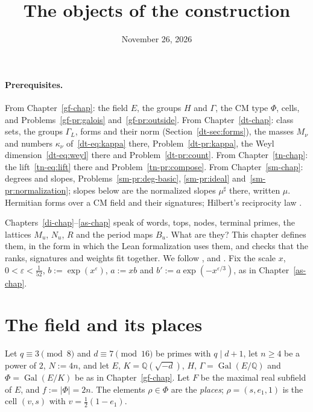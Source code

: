\documentclass[reqno]{amsart}
\title{The objects of the construction}
\author{}
\date{November 26, 2026}
\newcounter{chap}
\theoremstyle{definition}
\theoremstyle{plain}
\theoremstyle{remark}
\newcommand{\Q}{\mathbb Q}
\newcommand{\Gal}{\operatorname{Gal}}
\begin{document}
\maketitle
{}\label{chap}

\paragraph{Prerequisites.}
From Chapter~\ref{gf-chap}: the field \(E\), the groups \(H\) and \(\Gamma\), the CM type \(\Phi\), cells, and Problems~\ref{gf-pr:galois} and~\ref{gf-pr:outside}.  From Chapter~\ref{dt-chap}: class sets, the groups \(\Gamma_L\), forms and their norm (Section~\ref{dt-sec:forms}), the masses \(M_\nu\) and numbers \(\kappa_\nu\) of~\eqref{dt-eq:kappa} there, Problem~\ref{dt-pr:kappa}, the Weyl dimension~\eqref{dt-eq:weyl} there and Problem~\ref{dt-pr:count}.  From Chapter~\ref{tn-chap}: the lift~\eqref{tn-eq:lift} there and Problem~\ref{tn-pr:compose}.  From Chapter~\ref{sm-chap}: degrees and slopes, Problems~\ref{sm-pr:deg-basic}, \ref{sm-pr:ideal} and~\ref{sm-pr:normalization}; slopes below are the normalized slopes \(\mu^\sharp\) there, written \(\mu\).  Hermitian forms over a CM field and their signatures; Hilbert's reciprocity law \cite[Ch.~VI, \S8]{Ne}.

\medskip
Chapters~\ref{di-chap}--\ref{as-chap} speak of words, tops, nodes, terminal primes, the lattices \(M_u\), \(N_u\), \(R\) and the period maps \(B_u\).  What are they?  This chapter defines them, in the form in which the Lean formalization \cite{Lean} uses them, and checks that the ranks, signatures and weights fit together.  We follow \cite[\S III.10]{Rub}, \cite[\S4.1]{Zh} and \cite[\S7, Defs.~6.1, 11.5--11.10, 18.5, 18.9]{Adr}.  Fix the scale \(x\), \(0<\varepsilon<\frac1{52}\), \(b:=\exp(x^\varepsilon)\), \(a:=xb\) and \(b':=a\exp(-x^{\varepsilon/3})\), as in Chapter~\ref{as-chap}.

\section{The field and its places}\label{sec:field}

Let \(q\equiv3\pmod 8\) and \(d\equiv7\pmod{16}\) be primes with \(q\mid d+1\), let \(n\ge4\) be a power of \(2\), \(N:=4n\), and let \(E\), \(K=\Q(\sqrt{-d})\), \(H\), \(\Gamma=\Gal(E/\Q)\) and \(\Phi=\Gal(E/K)\) be as in Chapter~\ref{gf-chap}.  Let \(F\) be the maximal real subfield of \(E\), and \(f:=\lvert\Phi\rvert=2n\).  The elements \(\rho\in\Phi\) are the \emph{places}; \(\rho=(s,e_1,1)\) is the cell \((v,s)\) with \(v=\frac12(1-e_1)\).
\end{document}
